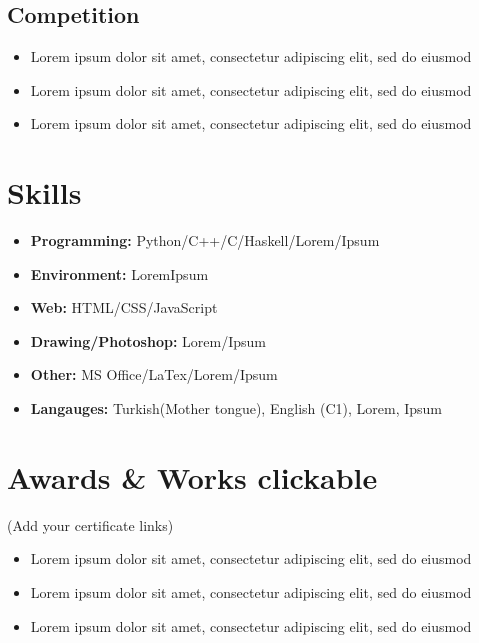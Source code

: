 \documentclass[]{props}
\begin{document}
\subsection{Competition}

\begin{itemize}
    \item[] Lorem ipsum dolor sit amet, consectetur adipiscing elit, sed do eiusmod
    \item[] Lorem ipsum dolor sit amet, consectetur adipiscing elit, sed do eiusmod
    \item[] Lorem ipsum dolor sit amet, consectetur adipiscing elit, sed do eiusmod
\end{itemize}

\section{Skills}

\begin{itemize}
    \item[] \textbf{Programming:} Python/C++/C/Haskell/Lorem/Ipsum
    \item[] \textbf{Environment:} LoremIpsum
    \item[] \textbf{Web:} HTML/CSS/JavaScript
    \item[] \textbf{Drawing/Photoshop:} Lorem/Ipsum
    \item[] \textbf{Other:} MS Office/LaTex/Lorem/Ipsum 
    \item[] \textbf{Langauges:} Turkish(Mother tongue), English (C1), Lorem, Ipsum
\end{itemize}

\section{Awards \& Works \large clickable} (Add your certificate links)

\begin{itemize}
    \item[] Lorem ipsum dolor sit amet, consectetur adipiscing elit, sed do eiusmod
    \item[] Lorem ipsum dolor sit amet, consectetur adipiscing elit, sed do eiusmod
    \item[] Lorem ipsum dolor sit amet, consectetur adipiscing elit, sed do eiusmod
\end{itemize}
\end{document}
